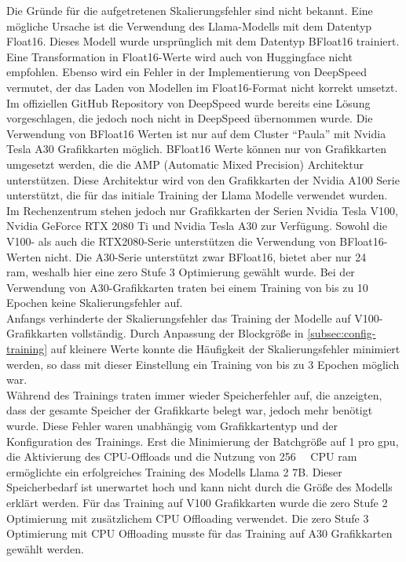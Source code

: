 Die Gründe für die aufgetretenen Skalierungsfehler sind nicht bekannt.
Eine mögliche Ursache ist die Verwendung des Llama-Modells mit dem Datentyp Float16.
Dieses Modell wurde ursprünglich mit dem Datentyp BFloat16 trainiert.
Eine Transformation in Float16-Werte wird auch von Huggingface nicht empfohlen.
Ebenso wird ein Fehler in der Implementierung von DeepSpeed vermutet, der das Laden von Modellen im Float16-Format nicht korrekt umsetzt.
Im offiziellen GitHub Repository von DeepSpeed wurde bereits eine Lösung vorgeschlagen, die jedoch noch nicht in DeepSpeed übernommen wurde.
Die Verwendung von BFloat16 Werten ist nur auf dem Cluster \enquote{Paula} mit Nvidia Tesla A30 Grafikkarten möglich.
BFloat16 Werte können nur von Grafikkarten umgesetzt werden, die die AMP (Automatic Mixed Precision) Architektur unterstützen.
Diese Architektur wird von den Grafikkarten der Nvidia A100 Serie unterstützt, die für das initiale Training der Llama Modelle verwendet wurden.
Im Rechenzentrum stehen jedoch nur Grafikkarten der Serien Nvidia Tesla V100, Nvidia GeForce RTX 2080 Ti und Nvidia Tesla A30 zur Verfügung.
Sowohl die V100- als auch die RTX2080-Serie unterstützen die Verwendung von BFloat16-Werten nicht.
Die A30-Serie unterstützt zwar BFloat16, bietet aber nur \SI{24}{\giga\byte} \ac{ram}, weshalb hier eine \ac{zero} Stufe 3 Optimierung gewählt wurde.
Bei der Verwendung von A30-Grafikkarten traten bei einem Training von bis zu 10 Epochen keine Skalierungsfehler auf.\\

Anfangs verhinderte der Skalierungsfehler das Training der Modelle auf V100-Grafikkarten vollständig.
Durch Anpassung der Blockgröße in \cref{subsec:config-training} auf kleinere Werte konnte die Häufigkeit der Skalierungsfehler minimiert werden, so dass mit dieser Einstellung ein Training von bis zu 3 Epochen möglich war.\\

Während des Trainings traten immer wieder Speicherfehler auf, die anzeigten, dass der gesamte Speicher der Grafikkarte belegt war, jedoch mehr benötigt wurde.
Diese Fehler waren unabhängig vom Grafikkartentyp und der Konfiguration des Trainings.
Erst die Minimierung der Batchgröße auf 1 pro \ac{gpu}, die Aktivierung des CPU-Offloads und die Nutzung von \SI{256}{\giga\byte} CPU \ac{ram} ermöglichte ein erfolgreiches Training des Modells Llama 2 7B.
Dieser Speicherbedarf ist unerwartet hoch und kann nicht durch die Größe des Modells erklärt werden.
Für das Training auf V100 Grafikkarten wurde die \ac{zero} Stufe 2 Optimierung mit zusätzlichem CPU Offloading verwendet.
Die \ac{zero} Stufe 3 Optimierung mit CPU Offloading musste für das Training auf A30 Grafikkarten gewählt werden.\\

